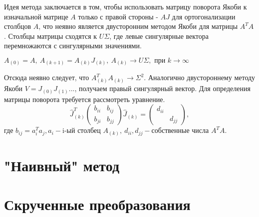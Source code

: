 \documentclass[12pt, a4paper]{report}
\theoremstyle{note}
\begin{document}
Идея метода заключается в том, чтобы использовать матрицу поворота Якоби к изначальной матрице $A$ только с правой стороны - $AJ$ для ортогонализации столбцов $A$, что неявно является двусторонним методом Якоби для матрицы $A^TA$.
Столбцы матрицы сходятся к $U\Sigma$, где левые сингулярные вектора перемножаются с сингулярными значениями.
\begin{center}
    $A_{(0)}=A,\ A_{(k+1)} = A_{(k)}J_{(k)},\ A_{(k)} \longrightarrow U\Sigma, \text{ при } k\to\infty$
\end{center}
Отсюда неявно следует, что $A^T_{(k)}A_{(k)} \to \Sigma^2$. Аналогично двустороннему методу Якоби $V = J_{(0)}J_{(1)}...$, получаем правый сингулярный вектор.
Для определения матрицы поворота требуется рассмотреть уравнение.
\begin{equation}
    \hat{J}^T_{(k)}\begin{pmatrix}
        b_{ii}&b_{ij}\\
        b_{ji}&b_{jj}
    \end{pmatrix}\hat{J}_{(k)} = \begin{pmatrix}
        d_{ii} &\\
        & d_{jj}
    \end{pmatrix},
\end{equation}
где $b_{ij} = a_i^Ta_j, a_i-\text{i-ый столбец }A_{(k)},\ d_{ii}, d_{jj} -\text{собственные числа } A^TA$.

\section{"Наивный" метод}

\section{Скрученные преобразования}
\newpage
\printbibliography
\end{document}
